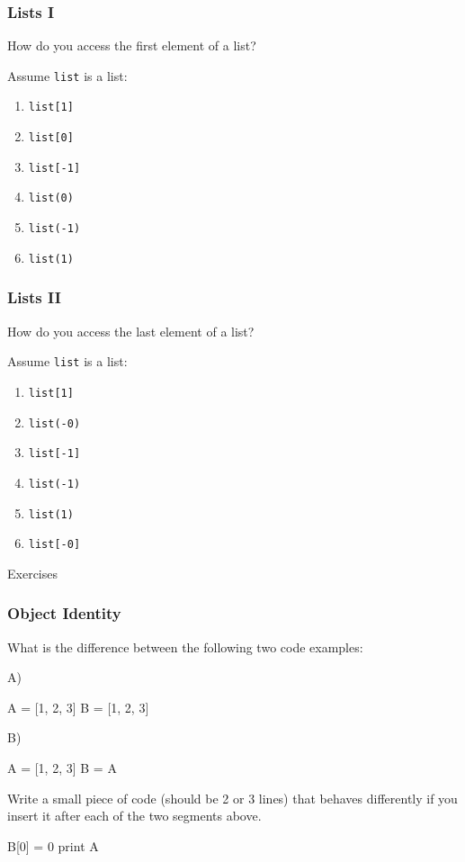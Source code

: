\begin{frame}
\frametitle{Lists I}

How do you access the first element of a list?

Assume \texttt{list} is a list:

\begin{enumerate}
\item \texttt{list[1]}
\item \texttt{list[0]}
\item \texttt{list[-1]}
\item \texttt{list(0)}
\item \texttt{list(-1)}
\item \texttt{list(1)}
\end{enumerate}
\end{frame}

\begin{frame}
\frametitle{Lists II}

How do you access the last element of a list?

Assume \texttt{list} is a list:

\begin{enumerate}
\item \texttt{list[1]}
\item \texttt{list(-0)}
\item \texttt{list[-1]}
\item \texttt{list(-1)}
\item \texttt{list(1)}
\item \texttt{list[-0]}
\end{enumerate}
\end{frame}

\begin{frame}
{}

\bigskip
\bigskip
\bigskip
Exercises
\end{frame}

\begin{frame}[fragile]
\frametitle{Object Identity}

What is the difference between the following two code examples:

A)
\begin{python}
A = [1, 2, 3]
B = [1, 2, 3]
\end{python}

B)

\begin{python}
A = [1, 2, 3]
B = A
\end{python}

Write a small piece of code (should be 2 or 3 lines) that behaves differently
if you insert it after each of the two segments above.

\pause

\begin{python}
B[0] = 0
print A
\end{python}

\end{frame}


